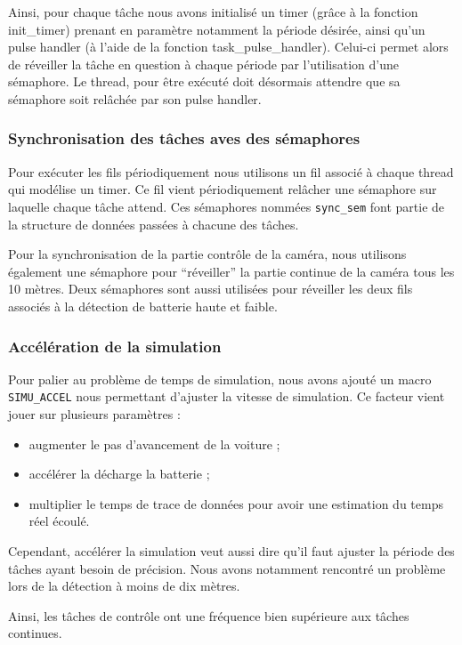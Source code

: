 \documentclass[conference]{IEEEtran}
\begin{document}
Ainsi, pour chaque tâche nous avons initialisé un timer (grâce à la fonction init\_timer) prenant en paramètre notamment la période désirée, ainsi qu'un pulse handler (à l'aide de la fonction task\_pulse\_handler). Celui-ci permet alors de réveiller la tâche en question à chaque période par l'utilisation d'une sémaphore. Le thread, pour être exécuté doit désormais attendre que sa sémaphore soit relâchée par son pulse handler.

\subsubsection{Synchronisation des tâches aves des sémaphores}

Pour exécuter les fils périodiquement nous utilisons un fil associé à chaque thread qui modélise un timer. Ce fil vient périodiquement relâcher une sémaphore sur laquelle chaque tâche attend. Ces sémaphores nommées \texttt{sync\_sem} font partie de la structure de données passées à chacune des tâches.

Pour la synchronisation de la partie contrôle de la caméra, nous utilisons également une sémaphore pour \enquote{réveiller} la partie continue de la caméra tous les 10 mètres. Deux sémaphores sont aussi utilisées pour réveiller les deux fils associés à la détection de batterie haute et faible.

\subsubsection{Accélération de la simulation}

Pour palier au problème de temps de simulation, nous avons ajouté un macro \texttt{SIMU\_ACCEL} nous permettant d'ajuster la vitesse de simulation. Ce facteur vient jouer sur plusieurs paramètres :
\begin{itemize}
    \item augmenter le pas d'avancement de la voiture ;
    \item accélérer la décharge la batterie ;
    \item multiplier le temps de trace de données pour avoir une estimation du temps réel écoulé.
\end{itemize}

Cependant, accélérer la simulation veut aussi dire qu'il faut ajuster la période des tâches ayant besoin de précision. Nous avons notamment rencontré un problème lors de la détection à moins de dix mètres.

Ainsi, les tâches de contrôle ont une fréquence bien supérieure aux tâches continues.
\end{document}
